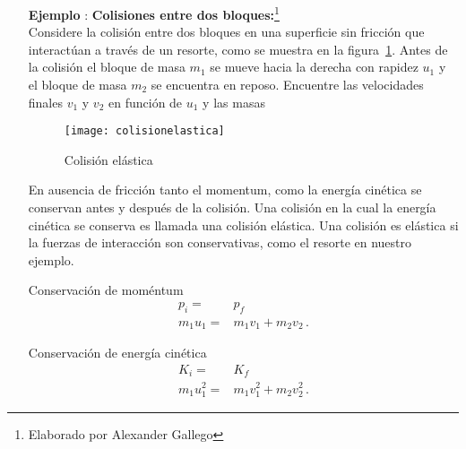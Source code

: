 \begin{itemize}
\item[\textbf{Ejemplo}]: \textbf{Colisiones entre dos bloques:}\footnote{Elaborado por Alexander Gallego}\\
Considere la colisión entre dos bloques en una superficie sin fricción que interactúan a través de un resorte, como se muestra en la figura~\ref{fig:colisionelastica}. Antes de la colisión el bloque de masa $m_1$ se mueve hacia la derecha con rapidez $u_1$ y el bloque de masa $m_2$ se encuentra en reposo. Encuentre las velocidades finales $v_1$ y $v_2$ en función de $u_1$ y las masas

\begin{figure}
  \centering
  \texttt{[image: colisionelastica]}
  \caption{Colisión elástica}
  \label{fig:colisionelastica}
\end{figure}

En ausencia de fricción tanto el momentum, como la energía cinética se conservan antes y después de la colisión. Una colisión en la cual la energía cinética se conserva es llamada una colisión elástica. Una colisión es elástica si la fuerzas de interacción son conservativas, como el resorte en nuestro ejemplo.

Conservaci\'on de moméntum
\begin{align}
  \label{eq:e1}
  p_{i}=&p_f\nonumber\\
  m_1 u_1 =& m_1 v_1 + m_2 v_2\,.
\end{align}

Conservaci\'on de energía cinética
\begin{align}
  \label{eq:e2}
  K_i=&K_f\nonumber\\
  m_1 u^2_1 =& m_1 v^2_1 + m_2 v^2_2\,.
\end{align}


\end{itemize}
